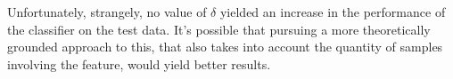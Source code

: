 \documentclass[12pt,a4paper]{article}
\begin{document}
Unfortunately, strangely, no value of $ \delta $ yielded an increase in the performance of the classifier on the test data.  It's possible that pursuing a more theoretically grounded approach to this, that also takes into account the quantity of samples involving the feature, would yield better results.




\end{document}
